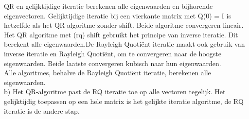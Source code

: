 QR en gelijktijdige iteratie berekenen alle eigenwaarden en bijhorende eigenvectoren. Gelijktijdige iteratie bij een vierkante matrix met Q(0) = I is hetzelfde als het QR algoritme zonder shift. Beide algoritme convergeren lineair.\\ [12pt]

Het QR algoritme met (rq) shift gebruikt het principe van inverse iteratie. Dit berekent alle eigenwaarden.De Rayleigh Quotiënt iteratie maakt ook gebruik van inverse iteratie en Rayleigh Quotiënt, om te convergeren naar de hoogste eigenwaarden. Beide laatste convergeren kubisch naar hun eigenwaarden.\\ [12pt]

Alle algoritmes, behalve de Rayleigh Quotiënt iteratie, berekenen alle eigenwaarden.\\ [12pt]

b) Het QR-algoritme past de RQ iteratie toe op alle vectoren tegelijk. Het gelijktijdig toepassen op een hele matrix
is het gelijkte iteratie algoritme, de RQ iteratie is de andere stap.